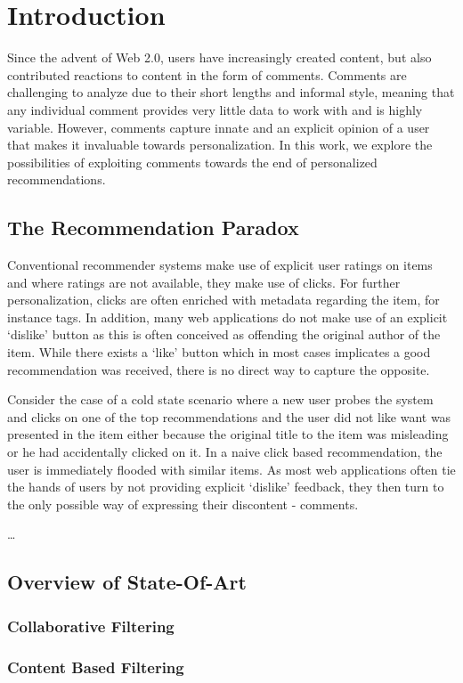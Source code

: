 \chapter{Introduction}
Since the advent of Web 2.0, users have increasingly created content, but also contributed reactions to content in the form of comments. Comments are challenging to analyze due to their short lengths and informal style, meaning that any individual comment provides very little data to work with and is highly variable. However, comments capture innate and an explicit opinion of a user that makes it invaluable towards personalization. In this work, we explore the possibilities of exploiting comments towards the end of personalized recommendations.

\section{The Recommendation Paradox}
Conventional recommender systems make use of explicit user ratings on items and where ratings are not available, they make use of clicks. For further personalization, clicks are often enriched with metadata regarding the item, for instance tags. In addition, many web applications do not make use of an explicit `dislike' button as this is often conceived as offending the original author of the item. While there exists a `like' button which in most cases implicates a good recommendation was received, there is no direct way to capture the opposite.

Consider the case of a cold state scenario where a new user probes the system and clicks on one of the top recommendations and the user did not like want was presented in the item either because the original title to the item was misleading or he had accidentally clicked on it. In a naive click based recommendation, the user is immediately flooded with similar items. As most web applications often tie the hands of users by not providing explicit `dislike' feedback, they then turn to the only possible way of expressing their discontent - comments.

\ldots

\section{Overview of State-Of-Art}
\subsection{Collaborative Filtering}
\subsection{Content Based Filtering}
